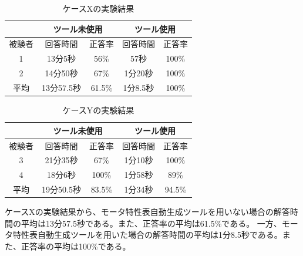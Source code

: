 \begin{table}[tp]
  \begin{center}
    \caption{ケースXの実験結果}
    \label{resultX}
    \begin{tabular}{c|c|c|c|c|}
    \cline{2-5}
                              & \multicolumn{2}{c|}{ツール未使用} & \multicolumn{2}{c|}{ツール使用} \\ \hline
    \multicolumn{1}{|c||}{被験者} & 回答時間           & 正答率          & 回答時間           & 正答率         \\ \hline\hline
    \multicolumn{1}{|c||}{1}   & 13分5秒           & 56\%         & 57秒           & 100\%         \\ \hline
    \multicolumn{1}{|c||}{2}   & 14分50秒          & 67\%          & 1分20秒          & 100\%         \\ \hline\hline
    \multicolumn{1}{|c||}{平均}   & 13分57.5秒          & 61.5\%          & 1分8.5秒          & 100\%         \\ \hline
    \end{tabular}
  \end{center}
\end{table}

\begin{table}[tp]
  \begin{center}
    \caption{ケースYの実験結果}
    \label{resultY}
    \begin{tabular}{c|c|c|c|c|}
    \cline{2-5}
                              & \multicolumn{2}{c|}{ツール未使用} & \multicolumn{2}{c|}{ツール使用} \\ \hline
    \multicolumn{1}{|c||}{被験者} & 回答時間           & 正答率          & 回答時間           & 正答率         \\ \hline\hline
    \multicolumn{1}{|c||}{3}   & 21分35秒           & 67\%         & 1分10秒           & 100\%         \\ \hline
    \multicolumn{1}{|c||}{4}   & 18分6秒          & 100\%          & 1分58秒          & 89\%         \\ \hline\hline
    \multicolumn{1}{|c||}{平均}   & 19分50.5秒          & 83.5\%          & 1分34秒          & 94.5\%         \\ \hline
    \end{tabular}
  \end{center}
\end{table}

ケースXの実験結果から、モータ特性表自動生成ツールを用いない場合の解答時間の平均は13分57.5秒である。また、正答率の平均は61.5\%である。
一方、モータ特性表自動生成ツールを用いた場合の解答時間の平均は1分8.5秒である。また、正答率の平均は100\%である。

